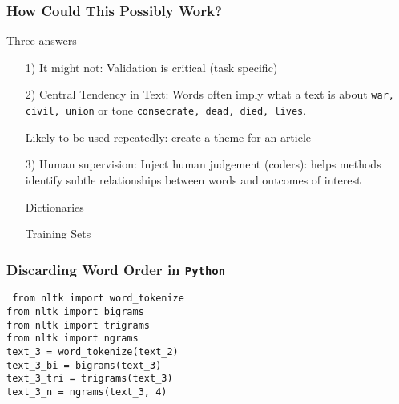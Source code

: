 \documentclass{beamer}
\numberwithin{equation}{section}
\begin{document}
\begin{frame}
\frametitle{How Could This Possibly Work?}

Three answers 
\begin{itemize}
\item[1)] \alert{It might not}: Validation is critical (task specific)
\item[2)] \alert{Central Tendency in Text}: Words often imply what a text is about 
{\tt war, civil, union} or tone {\tt consecrate, dead, died, lives}.  
\item[] Likely to be used repeatedly: create a theme for an article
\item[3)] \alert{Human supervision}: Inject human judgement (coders): helps methods identify subtle relationships between words and outcomes of interest
\item[] \alert{Dictionaries}
\item[] \alert{Training Sets}
\end{itemize}

\end{frame}


\begin{frame}
\frametitle{Discarding Word Order in {\tt Python}}

{\tt 
from nltk import word\_tokenize \\
from nltk import bigrams \\
from nltk import trigrams \\
from nltk import ngrams \\

\vspace{0.25in}
text\_3 = word\_tokenize(text\_2) \\
text\_3\_bi = bigrams(text\_3) \\
text\_3\_tri = trigrams(text\_3)\\
text\_3\_n = ngrams(text\_3, 4)\\

}


\end{frame}
\end{document}
